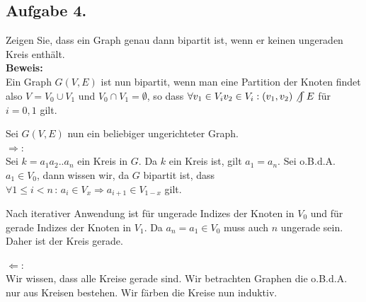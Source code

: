 \documentclass[11pt,a4paper,ngerman]{article}
\begin{document}
\subsection*{Aufgabe 4.}

Zeigen Sie, dass ein Graph genau dann bipartit ist, wenn er keinen ungeraden Kreis enthält.\\

\textbf{Beweis:}\\

Ein Graph $G(V,E)$ ist nun bipartit, wenn man eine Partition der Knoten findet also $V = V_0 \cup V_1$ und $V_0 \cap V_1 = \emptyset$,
so dass $\forall v_1 \in V_i v_2 \in V_i : (v_1,v_2) \not \int E$ für $i=0,1$ gilt.

Sei $G(V,E)$ nun ein beliebiger ungerichteter Graph.\\

$\Rightarrow$:\\

Sei $k = a_1a_2..a_n$ ein Kreis in $G$. Da $k$ ein Kreis ist, gilt $a_1=a_n$.
Sei o.B.d.A. $a_1 \in V_0$, dann wissen wir, da $G$ bipartit ist, dass $\forall 1 \leq i < n \, : \, a_i \in V_x \Rightarrow a_{i+1} \in V_{1-x}$ gilt.

Nach iterativer Anwendung ist für ungerade Indizes der Knoten in $V_0$ und für gerade Indizes der Knoten in $V_1$. Da $a_n = a_1 \in V_0$ muss auch $n$ ungerade sein.
Daher ist der Kreis gerade.

$\Leftarrow$:\\

Wir wissen, dass alle Kreise gerade sind.
Wir betrachten Graphen die o.B.d.A. nur aus Kreisen bestehen.
Wir färben die Kreise nun induktiv.
\end{document}
